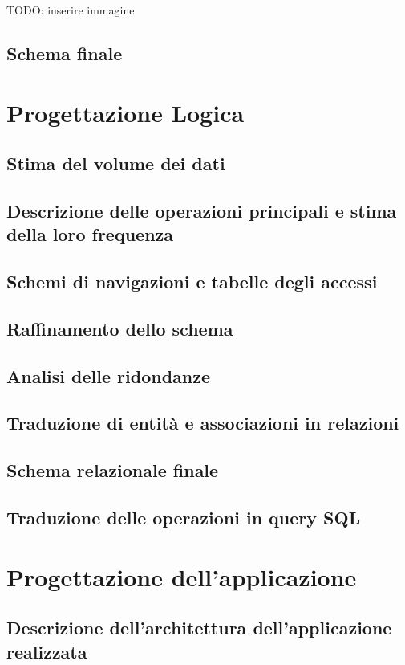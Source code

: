 \documentclass[a4paper,12pt, oneside]{article}
\begin{document}
TODO: inserire immagine

\subsection{Schema finale}

\section{Progettazione Logica}
\subsection{Stima del volume dei dati}
\subsection{Descrizione delle operazioni principali e stima della loro frequenza}
\subsection{Schemi di navigazioni e tabelle degli accessi}
\subsection{Raffinamento dello schema}
\subsection{Analisi delle ridondanze}
\subsection{Traduzione di entità e associazioni in relazioni}
\subsection{Schema relazionale finale}
\subsection{Traduzione delle operazioni in query SQL}

\section{Progettazione dell'applicazione}
\subsection{Descrizione dell'architettura dell'applicazione realizzata}
\end{document}

